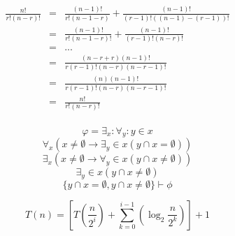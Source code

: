\documentclass[a4paper,12pt]{article}
\begin{document}
\begin{eqnarray*}
\frac{n!}{r!(n-r)!}&=&\frac{(n-1)!}{r!(n-1-r)}+\frac{(n-1)!}{(r-1)!((n-1)-(r-1))!}\\
&=&\frac{(n-1)!}{r!(n-1-r)!}+\frac{(n-1)!}{(r-1)!(n-r)!}\\
&=&...\\
&=&\frac{(n-r+r)(n-1)!}{r(r-1)!(n-r)(n-r-1)!}\\
&=&\frac{(n)(n-1)!}{r(r-1)!(n-r)(n-r-1)!}\\
&=&\frac{n!}{r!(n-r)!}\\
\end{eqnarray*}

\[\varphi=\exists_x:\forall_y:y\in x\]
\[\forall_x (x\neq\emptyset\to\exists_y\in x(y\cap x = \emptyset))\]
\[\exists_x (x\neq\emptyset\to\forall_y\in x(y\cap x \neq \emptyset))\]
\[\exists_y \in x(y\cap x \neq \emptyset)\]
\[\{y\cap x = \emptyset , y\cap x \neq \emptyset\} \vdash \phi\]

\[T(n) = \left[T\left(\frac{n}{2^i}\right)+\sum_{k=0}^{i-1} \left(\log_2\frac{n}{2^k}\right)\right]+1\]
\end{document}

